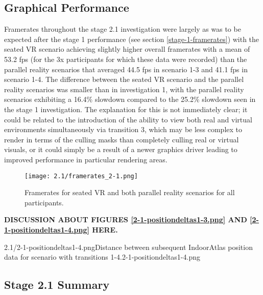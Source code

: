 \subsection{Graphical Performance}
\label{stage-2-1-framerates}
Framerates throughout the stage 2.1 investigation were largely as was to be expected after the stage 1 performance (see section \ref{stage-1-framerates}) with the seated VR scenario achieving slightly higher overall framerates with a mean of 53.2 fps (for the 3x participants for which these data were recorded) than the parallel reality scenarios that averaged 44.5 fps in scenario 1-3 and 41.1 fps in scenario 1-4. The difference between the seated VR scenario and the parallel reality scenarios was smaller than in investigation 1, with the parallel reality scenarios exhibiting a 16.4\% slowdown compared to the 25.2\% slowdown seen in the stage 1 investigation. The explanation for this is not immediately clear; it could be related to the introduction of the ability to view both real and virtual environments simultaneously via transition 3, which may be less complex to render in terms of the culling masks than completely culling real or virtual visuals, or it could simply be a result of a newer graphics driver leading to improved performance in particular rendering areas.

\begin{figure}[h]
	\begin{center}
	\texttt{[image: 2.1/framerates\_2-1.png]}
	\caption{Framerates for seated VR and both parallel reality scenarios for all participants.}
	\label{framerates_2-1.png}
	\end{center}
\end{figure}

\textbf{DISCUSSION ABOUT FIGURES \ref{2-1-positiondeltas1-3.png} AND \ref{2-1-positiondeltas1-4.png} HERE.}

       {2.1/2-1-positiondeltas1-4.png}{Distance between subsequent IndoorAtlas position data for scenario with transitions 1-4.}{2-1-positiondeltas1-4.png}


\subsection{Stage 2.1 Summary}

